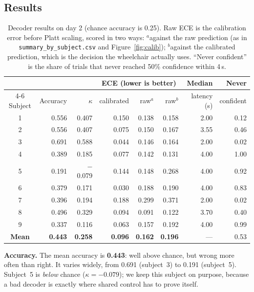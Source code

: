 \documentclass[11pt,a4paper]{article}
\newcommand{\code}[1]{\texttt{#1}}
\begin{document}
\subsection{Results}

\begin{table}[H]
\centering\small
\begin{tabular}{@{}crrrrrrr@{}}
\toprule
 & & & \multicolumn{3}{c}{ECE (lower is better)} & Median & Never \\
\cmidrule(lr){4-6}
Subject & Accuracy & $\kappa$ & calibrated & raw$^{a}$ & raw$^{b}$ & latency (s) & confident \\
\midrule
1 & 0.556 & 0.407 & 0.150 & 0.138 & 0.158 & 2.00 & 0.12 \\
2 & 0.556 & 0.407 & 0.075 & 0.150 & 0.167 & 3.55 & 0.46 \\
3 & 0.691 & 0.588 & 0.044 & 0.146 & 0.164 & 2.00 & 0.02 \\
4 & 0.389 & 0.185 & 0.077 & 0.142 & 0.131 & 4.00 & 1.00 \\
5 & 0.191 & $-$0.079 & 0.144 & 0.148 & 0.268 & 4.00 & 0.92 \\
6 & 0.379 & 0.171 & 0.030 & 0.188 & 0.190 & 4.00 & 0.83 \\
7 & 0.396 & 0.194 & 0.188 & 0.299 & 0.371 & 2.00 & 0.02 \\
8 & 0.496 & 0.329 & 0.094 & 0.091 & 0.122 & 3.70 & 0.40 \\
9 & 0.337 & 0.116 & 0.063 & 0.157 & 0.192 & 4.00 & 0.99 \\
\midrule
\textbf{Mean} & \textbf{0.443} & \textbf{0.258} & \textbf{0.096} & \textbf{0.162} & \textbf{0.196} & --- & 0.53 \\
\bottomrule
\end{tabular}
\caption{Decoder results on day 2 (chance accuracy is 0.25). Raw ECE is
the calibration error before Platt scaling, scored in two ways:
$^{a}$against the raw prediction (as in \code{summary\_by\_subject.csv}
and Figure~\ref{fig:calib}); $^{b}$against the calibrated prediction,
which is the decision the wheelchair actually uses. ``Never confident'' is
the share of trials that never reached 50\% confidence within 4\,s.}
\label{tab:decoder}
\end{table}

\textbf{Accuracy.} The mean accuracy is \textbf{0.443}: well above chance,
but wrong more often than right. It varies widely, from 0.691
(subject~3) to 0.191 (subject~5). Subject~5 is \emph{below} chance
($\kappa = -0.079$); we keep this subject on purpose, because a bad
decoder is exactly where shared control has to prove itself.
\end{document}
